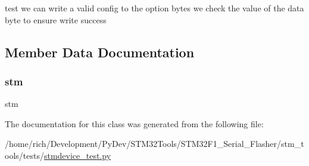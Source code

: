\begin{DoxyVerb}test we can write a valid config to the option bytes
we check the value of the data byte to ensure write success
\end{DoxyVerb}
 

\subsection{Member Data Documentation}
\mbox{\label{classstm__tools_1_1tests_1_1stmdevice__test_1_1STMInterfaceTestCase_ada855626ae0ce416b8edf41f44ab7bd5}} 
\subsubsection{\texorpdfstring{stm}{stm}}
{\footnotesize\ttfamily stm}



The documentation for this class was generated from the following file\+:\begin{DoxyCompactItemize}
\item 
/home/rich/\+Development/\+Py\+Dev/\+S\+T\+M32\+Tools/\+S\+T\+M32\+F1\+\_\+\+Serial\+\_\+\+Flasher/stm\+\_\+tools/tests/\hyperlink{stmdevice__test_8py}{stmdevice\+\_\+test.\+py}\end{DoxyCompactItemize}
